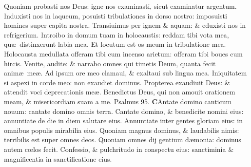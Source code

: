 \documentclass[a5paper,10pt]{book}
\def\ae{æ}
\def\oe{œ}
\begin{document}
\begin{multicols*}{2}
\newline \color{red} Q\color{black}uoniam probasti nos Deus: igne nos examinasti, sicut examinatur argentum.
\newline \color{red} I\color{black}nduxisti nos in laqueum, posuisti tribulationes in dorso nostro: imposuisti homines super capita nostra.
\newline \color{red} T\color{black}ransiuimus per ignem \& aquam: \& eduxisti nos in refrigerium.
\newline \color{red} I\color{black}ntroibo in domum tuam in holocaustis: reddam tibi vota mea, qu\ae \ distinxerunt labia mea.
\newline \color{red} E\color{black}t locutum est os meum in tribulatione mea.
\newline \color{red} H\color{black}olocausta medullata offeram tibi cum incenso arietum: offeram tibi boues cum hircis.
\newline \color{red} V\color{black}enite, audite: \& narrabo omnes qui timetis Deum, quanta fecit anim\ae \ me\ae .
\newline \color{red} A\color{black}d ipsum ore meo clamaui, \& exaltaui sub lingua mea.%
\newline \color{red} I\color{black}niquitatem si aspexi in corde meo: non exaudiet dominus.
\newline \color{red} P\color{black}ropterea exaudiuit Deus: \& attendit voci deprecationis me\ae .
\newline \color{red} B\color{black}enedictus Deus, qui non amouit orationem meam, \& misericordiam suam a me. \quad \color{red} Psalmus 95. \color{black}
\vspace{-1em}
\lettrine[lines=2]{\bfseries \color{red} C}{}Antate domino canticum nouum: cantate domino omnis terra.
\newline \color{red} C\color{black}antate domino, \& benedicite nomini eius: annuntiate de die in diem salutare eius.
\newline \color{red} A\color{black}nnuntiate inter gentes gloriam eius: in omnibus populis mirabilia eius.
\newline \color{red} Q\color{black}uoniam magnus dominus, \& laudabilis nimis: terribilis est super omnes deos.
\newline \color{red} Q\color{black}uoniam omnes dij gentium d\ae monia: dominus autem c\oe los fecit.
\newline \color{red} C\color{black}onfessio, \& pulchritudo in conspectu eius: sanctiminia \& magnificentia in sanctificatione eius.

\end{multicols*}
\end{document}
